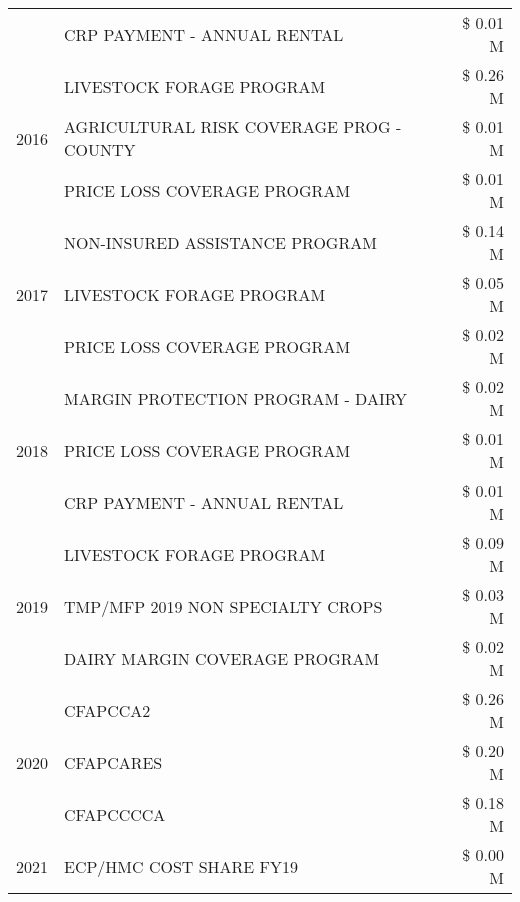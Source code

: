 \begin{tabular}{llr}
 & CRP PAYMENT - ANNUAL RENTAL & \$ 0.01 M \\
\cline{1-3}
\multirow[t]{3}{*}{2016} & LIVESTOCK FORAGE PROGRAM                      & \$ 0.26 M \\
 & AGRICULTURAL RISK COVERAGE PROG - COUNTY      & \$ 0.01 M \\
 & PRICE LOSS COVERAGE PROGRAM                   & \$ 0.01 M \\
\cline{1-3}
\multirow[t]{3}{*}{2017} & NON-INSURED ASSISTANCE PROGRAM & \$ 0.14 M \\
 & LIVESTOCK FORAGE PROGRAM & \$ 0.05 M \\
 & PRICE LOSS COVERAGE PROGRAM & \$ 0.02 M \\
\cline{1-3}
\multirow[t]{3}{*}{2018} & MARGIN PROTECTION PROGRAM - DAIRY & \$ 0.02 M \\
 & PRICE LOSS COVERAGE PROGRAM & \$ 0.01 M \\
 & CRP PAYMENT - ANNUAL RENTAL & \$ 0.01 M \\
\cline{1-3}
\multirow[t]{3}{*}{2019} & LIVESTOCK FORAGE PROGRAM & \$ 0.09 M \\
 & TMP/MFP 2019 NON SPECIALTY CROPS & \$ 0.03 M \\
 & DAIRY MARGIN COVERAGE PROGRAM & \$ 0.02 M \\
\cline{1-3}
\multirow[t]{3}{*}{2020} & CFAPCCA2 & \$ 0.26 M \\
 & CFAPCARES & \$ 0.20 M \\
 & CFAPCCCCA & \$ 0.18 M \\
\cline{1-3}
2021 & ECP/HMC COST SHARE FY19 & \$ 0.00 M \\
\cline{1-3}
\bottomrule
\end{tabular}

